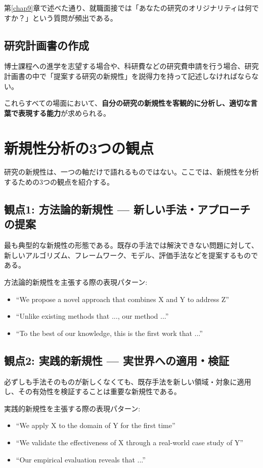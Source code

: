 第\ref{chap9}章で述べた通り、就職面接では「あなたの研究のオリジナリティは何ですか？」という質問が頻出である。

\subsection*{研究計画書の作成}

博士課程への進学を志望する場合や、科研費などの研究費申請を行う場合、研究計画書の中で「提案する研究の新規性」を説得力を持って記述しなければならない。

これらすべての場面において、\textbf{自分の研究の新規性を客観的に分析し、適切な言葉で表現する能力}が求められる。

\section{新規性分析の3つの観点}

研究の新規性は、一つの軸だけで語れるものではない。ここでは、新規性を分析するための3つの観点を紹介する。

\subsection{観点1: 方法論的新規性 --- 新しい手法・アプローチの提案}

最も典型的な新規性の形態である。既存の手法では解決できない問題に対して、新しいアルゴリズム、フレームワーク、モデル、評価手法などを提案するものである。

方法論的新規性を主張する際の表現パターン:
\begin{itemize}
\item ``We propose a novel approach that combines X and Y to address Z''
\item ``Unlike existing methods that ..., our method ...''
\item ``To the best of our knowledge, this is the first work that ...''
\end{itemize}

\subsection{観点2: 実践的新規性 --- 実世界への適用・検証}

必ずしも手法そのものが新しくなくても、既存手法を新しい領域・対象に適用し、その有効性を検証することは重要な新規性である。

実践的新規性を主張する際の表現パターン:
\begin{itemize}
\item ``We apply X to the domain of Y for the first time''
\item ``We validate the effectiveness of X through a real-world case study of Y''
\item ``Our empirical evaluation reveals that ...''
\end{itemize}

